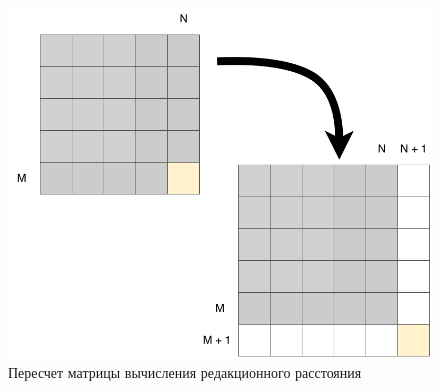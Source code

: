 \begin{figure}[H]
	\centering
	\includegraphics[scale=0.5]{img/matrixrecompute.png}
	\caption{Пересчет матрицы вычисления редакционного расстояния}
\end{figure}

